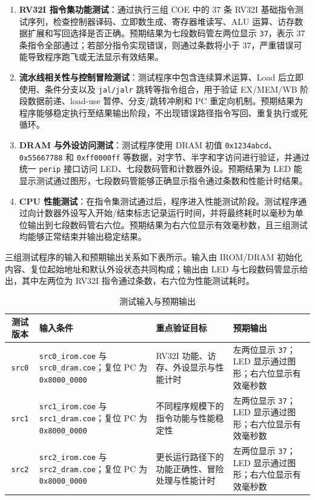 \documentclass[12pt,a4paper]{ctexart}
\newcommand{\code}[1]{\texttt{#1}}
\begin{document}
\begin{enumerate}
	\item \textbf{RV32I 指令集功能测试}：通过执行三组 COE 中的 37 条 RV32I 基础指令测试序列，检查控制器译码、立即数生成、寄存器堆读写、ALU 运算、访存数据扩展和写回选择是否正确。预期结果为七段数码管左两位显示 \code{37}，表示 37 条指令全部通过；若部分指令实现错误，则通过条数将小于 37，严重错误可能导致程序跑飞或无法显示有效结果。
	\item \textbf{流水线相关性与控制冒险测试}：测试程序中包含连续算术运算、Load 后立即使用、条件分支以及 \code{jal/jalr} 跳转等指令组合，用于验证 EX/MEM/WB 阶段数据前递、load-use 暂停、分支/跳转冲刷和 PC 重定向机制。预期结果为程序能够稳定执行至结果输出阶段，不出现错误路径指令写回、重复执行或死循环。
	\item \textbf{DRAM 与外设访问测试}：测试程序使用 DRAM 初值 \code{0x1234abcd}、\code{0x55667788} 和 \code{0xff0000ff} 等数据，对字节、半字和字访问进行验证，并通过统一 \code{perip} 接口访问 LED、七段数码管和计数器外设。预期结果为 LED 能显示测试通过图形，七段数码管能够正确显示指令通过条数和性能计时结果。
	\item \textbf{CPU 性能测试}：在指令集测试通过后，程序进入性能测试阶段。测试程序通过向计数器外设写入开始/结束标志记录运行时间，并将最终耗时以毫秒为单位输出到七段数码管右六位。预期结果为右六位显示有效毫秒数，且三组测试均能够正常结束并输出稳定结果。
\end{enumerate}

三组测试程序的输入和预期输出关系如下表所示。输入由 IROM/DRAM 初始化内容、复位起始地址和默认外设状态共同构成；输出由 LED 与七段数码管显示给出，其中左两位为 RV32I 指令通过条数，右六位为性能测试耗时。

\begin{table}[H]
	\centering
	\caption{测试输入与预期输出}
	\small
	\begin{tabular}{c|p{4.2cm}|p{4.2cm}|p{4.2cm}}
		\hline
		测试版本 & 输入条件 & 重点验证目标 & 预期输出 \\
		\hline
		\code{src0} & \code{src0\_irom.coe} 与 \code{src0\_dram.coe}；复位 PC 为 \code{0x8000\_0000} & RV32I 功能、访存、外设显示与性能计时 & 左两位显示 \code{37}；LED 显示通过图形；右六位显示有效毫秒数 \\
		\code{src1} & \code{src1\_irom.coe} 与 \code{src1\_dram.coe}；复位 PC 为 \code{0x8000\_0000} & 不同程序规模下的指令功能与性能稳定性 & 左两位显示 \code{37}；LED 显示通过图形；右六位显示有效毫秒数 \\
		\code{src2} & \code{src2\_irom.coe} 与 \code{src2\_dram.coe}；复位 PC 为 \code{0x8000\_0000} & 更长运行路径下的功能正确性、冒险处理与性能计时 & 左两位显示 \code{37}；LED 显示通过图形；右六位显示有效毫秒数 \\
		\hline
	\end{tabular}
\end{table}
\end{document}
